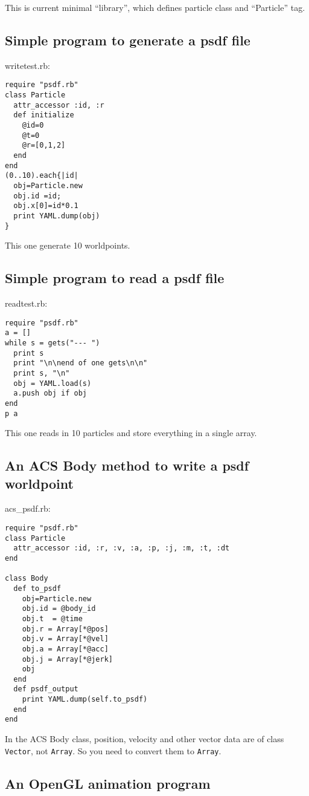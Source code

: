 \documentclass[5p,authoryear]{elsarticle}
\begin{document}
This is current minimal ``library'', which defines particle class and
``Particle'' tag.

\subsection{Simple program to generate a psdf file}

writetest.rb:
\begin{verbatim}
require "psdf.rb"
class Particle
  attr_accessor :id, :r   
  def initialize
    @id=0
    @t=0
    @r=[0,1,2]
  end
end
(0..10).each{|id|
  obj=Particle.new
  obj.id =id;
  obj.x[0]=id*0.1
  print YAML.dump(obj)
}
\end{verbatim}

This one generate 10 worldpoints.

\subsection{Simple program to read a psdf file}

readtest.rb:
\begin{verbatim}
require "psdf.rb"
a = []
while s = gets("--- ")
  print s
  print "\n\nend of one gets\n\n"
  print s, "\n"
  obj = YAML.load(s) 
  a.push obj if obj
end
p a
\end{verbatim}

This one reads in 10 particles and store everything in a single array.

\subsection{An ACS Body method to write a psdf worldpoint}

acs\_psdf.rb:
\begin{verbatim}
require "psdf.rb"
class Particle
  attr_accessor :id, :r, :v, :a, :p, :j, :m, :t, :dt
end

class Body
  def to_psdf
    obj=Particle.new
    obj.id = @body_id
    obj.t  = @time
    obj.r = Array[*@pos]
    obj.v = Array[*@vel]
    obj.a = Array[*@acc]
    obj.j = Array[*@jerk]
    obj
  end
  def psdf_output
    print YAML.dump(self.to_psdf)
  end
end
\end{verbatim}

In the ACS Body class, position, velocity and other vector data are of
class {\tt Vector}, not {\tt Array}. So you need to convert them to
{\tt Array}.

\subsection{An OpenGL animation program}
\end{document}
